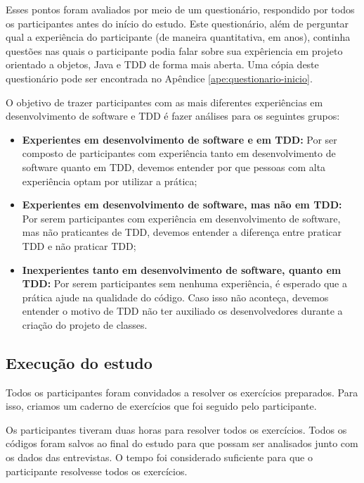 Esses pontos foram avaliados por meio de um questionário, 
respondido por todos os participantes antes do início do estudo. 
Este questionário, além de perguntar qual a experiência
do participante (de maneira quantitativa, em anos), 
continha questões nas quais o participante
podia falar sobre sua expêriencia em projeto orientado a objetos,
Java e TDD de forma mais aberta.
Uma cópia deste questionário
pode ser encontrada no Apêndice \ref{ape:questionario-inicio}.

O objetivo de trazer participantes com as mais diferentes experiências em desenvolvimento
de software e TDD é fazer análises para os seguintes grupos:

\begin{itemize}
	\item \textbf{Experientes em desenvolvimento de software e em TDD:} 
	Por ser composto de participantes com experiência tanto
	em desenvolvimento de software quanto em TDD, devemos entender por que
	pessoas com alta experiência optam por utilizar a prática;
	
	\item \textbf{Experientes em desenvolvimento de software, mas não em TDD:} 
	Por serem participantes com experiência em desenvolvimento
	de software, mas não praticantes de TDD, devemos entender a diferença entre
	praticar TDD e não praticar TDD;
		
	\item \textbf{Inexperientes tanto em desenvolvimento de software, quanto em TDD:} 
	Por serem participantes sem nenhuma experiência, é esperado que
	a prática ajude na qualidade do código. Caso isso não aconteça, devemos
	entender o motivo de TDD não ter auxiliado os desenvolvedores durante a 
	criação do projeto de classes.
\end{itemize}

\subsection{Execução do estudo}
\label{sec:execucao}	

Todos os participantes foram convidados a resolver os exercícios preparados. 
Para isso, criamos um caderno de exercícios que foi seguido pelo participante.

Os participantes tiveram duas horas para resolver todos os exercícios. 
Todos os códigos foram salvos ao final do estudo para que possam ser analisados junto
com os dados das entrevistas.
O tempo foi considerado suficiente para que o participante resolvesse todos os
exercícios. 


